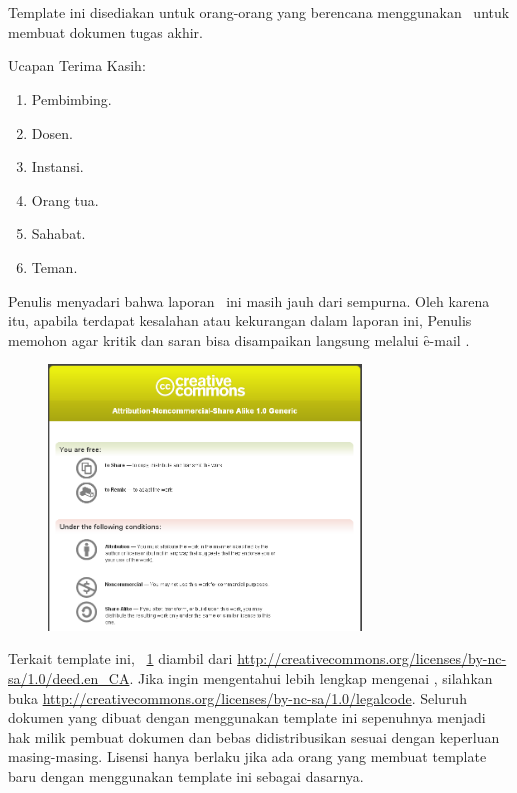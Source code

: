 \chapter*{\kataPengantar}

Template ini disediakan untuk orang-orang yang berencana menggunakan \latex~untuk membuat dokumen tugas akhir.


Ucapan Terima Kasih:
\begin{enumerate}[topsep=0pt,itemsep=-1ex,partopsep=1ex,parsep=1ex]
	\item Pembimbing.
	\item Dosen.
	\item Instansi.
	\item Orang tua.
	\item Sahabat.
	\item Teman.
\end{enumerate}

Penulis menyadari bahwa laporan \type~ini masih jauh dari sempurna. Oleh karena itu, apabila terdapat kesalahan atau kekurangan dalam laporan ini, Penulis memohon agar kritik dan saran bisa disampaikan langsung melalui \f{e-mail} .

\begin{figure}
	\centering
	\includegraphics[width=0.74\textwidth]
	{pics/creative_commons.png}
	\caption*{\license}
	\label{fig:lisensi}
\end{figure}

Terkait template ini, \pic~\ref{fig:lisensi} diambil dari \url{http://creativecommons.org/licenses/by-nc-sa/1.0/deed.en_CA}. Jika ingin mengentahui lebih lengkap mengenai \license, silahkan buka \url{http://creativecommons.org/licenses/by-nc-sa/1.0/legalcode}.
Seluruh dokumen yang dibuat dengan menggunakan template ini sepenuhnya menjadi hak milik pembuat dokumen dan bebas didistribusikan sesuai dengan keperluan masing-masing.
Lisensi hanya berlaku jika ada orang yang membuat template baru dengan menggunakan template ini sebagai dasarnya.

